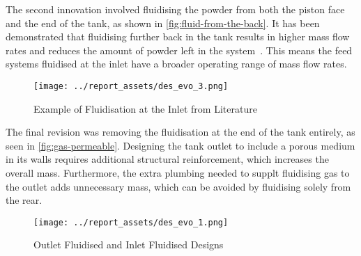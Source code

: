 The second innovation involved fluidising the powder from both the piston face and the end of the tank, as shown in \autoref{fig:fluid-from-the-back}. It has been demonstrated that fluidising further back in the tank results in higher mass flow rates and reduces the amount of powder left in the system~\cite{Tang22}. This means the feed systems fluidised at the inlet have a broader operating range of mass flow rates.
\begin{figure}[htbp]
    \centering
    
    \begin{minipage}{0.7\textwidth}
        \centering
        \texttt{[image: ../report\_assets/des\_evo\_3.png]}
        \caption{Example of Fluidisation at the Inlet from Literature~\cite{NASA2008_20080002287}}\label{fig:fluid-from-the-back}
    \end{minipage}
   
\end{figure}

The final revision was removing the fluidisation at the end of the tank entirely, as seen in \autoref{fig:gas-permeable}. Designing the tank outlet to include a porous medium in its walls requires additional structural reinforcement, which increases the overall mass. Furthermore, the extra plumbing needed to supplt fluidising gas to the outlet adds unnecessary mass, which can be avoided by fluidising solely from the rear.
\begin{figure}[htbp]
    \centering
    
    \begin{minipage}{0.6\textwidth}
        \centering
        \texttt{[image: ../report\_assets/des\_evo\_1.png]}
        \caption{Outlet Fluidised and Inlet Fluidised Designs~\cite{TANG2023118406}}\label{fig:gas-permeable}
    \end{minipage}
   
\end{figure}

